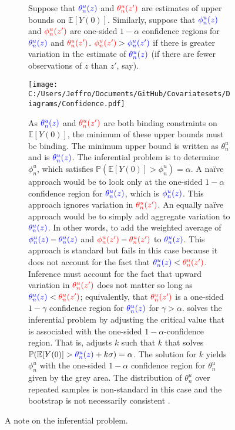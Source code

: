 \documentclass[10pt,a4paper,twoside]{article}
\numberwithin{equation}{section}
\begin{document}
\begin{figure}[p]
\centering
\begin{subfigure}{0.8\textwidth}
\caption{Suppose that $\color{blue}\theta_n^u(z)\color{black}$ and $\color{red}\theta_n^u(z')\color{black}$ are estimates of upper bounds on $\mathbb{E}[Y(0)]$. Similarly, suppose that $\color{blue}\phi_n^u(z)\color{black}$ and $\color{red}\phi_n^u(z')\color{black}$ are one-sided $1-\alpha$ confidence regions for $\color{blue}\theta_n^u(z)\color{black}$ and $\color{red}\theta_n^u(z')\color{black}$. $\color{red}\phi_n^u(z')\color{black}>\color{blue}\phi_n^u(z')\color{black}$ if there is greater variation in the estimate of $\color{blue}\theta_n^u(z)\color{black}$ (if there are fewer observations of $z$ than $z'$, say).}
\texttt{[image: C:/Users/Jeffro/Documents/GitHub/Covariatesets/Diagrams/Confidence.pdf]}
\caption{As $\color{blue}\theta_n^u(z)\color{black}$ and $\color{red}\theta_n^u(z')\color{black}$ are both binding constraints on $\mathbb{E}[Y(0)]$, the minimum of these upper bounds must be binding. The minimum upper bound is written as $\theta^u_n$ and is $\color{blue}\theta_n^u(z)\color{black}$. The inferential problem is to determine $\phi_n^u$, which satisfies 
$\mathbb{P}(\mathbb{E}[Y(0)]>\phi_n^u)=\alpha$. A na{\"i}ve approach would be to look only at the one-sided $1-\alpha$ confidence region for $\color{blue}\theta_n^u(z)\color{black}$, which is $\color{blue}\phi_n^u(z)\color{black}$. This approach ignores variation in $\color{red}\theta_n^u(z')\color{black}$. An equally na{\"i}ve approach would be to simply add aggregate variation to $\color{blue}\theta_n^u(z)\color{black}$. In other words, to add the weighted average of $\color{blue}\phi_n^u(z)\color{black}-\color{blue}\theta_n^u(z)\color{black}$ and $\color{red}\phi_n^u(z')\color{black}-\color{red}\theta_n^u(z')\color{black}$ to $\color{blue}\theta_n^u(z)\color{black}$. This approach is standard but fails in this case because it does not account for the fact that $\color{blue}\theta_n^u(z)\color{black}<\color{red}\theta_n^u(z')\color{black}$. Inference must account for the fact that upward variation in $\color{red}\theta_n^u(z')\color{black}$ does not matter so long as $\color{blue}\theta_n^u(z)\color{black}<\color{red}\theta_n^u(z')\color{black}$; equivalently, that $\color{red}\theta_n^u(z')\color{black}$ is a one-sided $1-\gamma$ confidence region for $\color{blue}\theta_n^u(z)\color{black}$ for $\gamma>\alpha$. \cite{cHlr13} solves the inferential problem by adjusting the critical value that is associated with the one-sided $1-\alpha$-confidence region. That is, \cite{cHlr13} adjusts $k$ such that $k$ that solves $\mathbb{P}(\mathbb{E}[Y(0)]>\color{blue}\theta_n^u(z)\color{black}+k\sigma)=\alpha$. The solution for $k$ yields $\phi_n^u$ with the one-sided $1-\alpha$ confidence region for $\theta_n^u$ given by the grey area. The distribution of $\theta_n^u$ over repeated samples is non-standard in this case and the bootstrap is  not necessarily consistent \citep{bU10}.} 
\end{subfigure}
\caption{A note on the inferential problem.}
\label{fig:confidence}
\end{figure}
\end{document}
